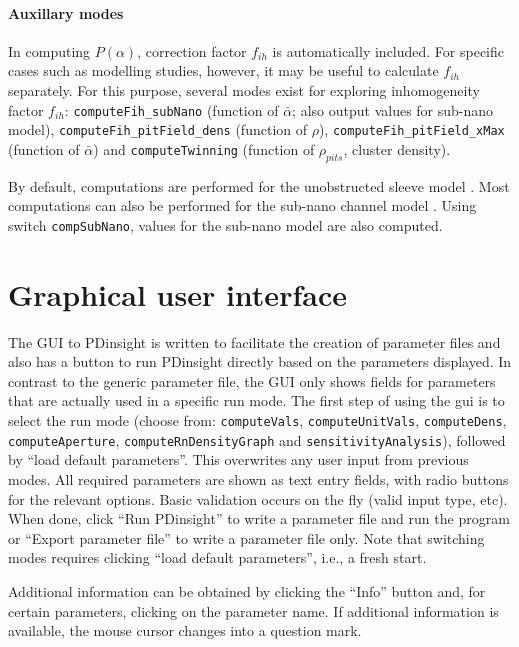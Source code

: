 \documentclass[a4paper,12pt]{article}
\newcommand{\SEL}{\bar{\alpha}}
\newcommand{\patchy}{f_{ih}}
\begin{document}
\paragraph{Auxillary modes} In computing $P(\alpha)$, correction factor $\patchy$ is automatically included. For specific cases such as modelling studies, however, it may be useful to calculate $\patchy$ separately. For this purpose, several modes exist for  exploring inhomogeneity factor $\patchy$: \texttt{computeFih\_subNano} (function of $\SEL$; also output values for sub-nano model), \texttt{computeFih\_pitField\_dens} (function of $\rho$), \texttt{computeFih\_pitField\_xMax} (function of $\SEL$) and \texttt{computeTwinning} (function of $\rho_{pits}$, cluster density). 


By default, computations are performed for the unobstructed sleeve model \citep{Deinum.e19}. Most computations can also be performed for the sub-nano channel model \cite{Liesche.fps13,Comtet.pp17}. Using switch \texttt{compSubNano}, values for the sub-nano model are also computed. 

\section{Graphical user interface}
The GUI to PDinsight is written to facilitate the creation of parameter files and also has a button to run PDinsight directly based on the parameters displayed. In contrast to the generic parameter file, the GUI only shows fields for parameters that are actually used in a specific run mode. The first step of using the gui is to select the run mode (choose from: \texttt{computeVals}, \texttt{computeUnitVals}, \texttt{computeDens}, \texttt{computeAperture},  \texttt{computeRnDensityGraph} and \texttt{sensitivityAnalysis}), followed by ``load default parameters''. This overwrites any user input from previous modes. All required parameters are shown as text entry fields, with radio buttons for the relevant options. Basic validation occurs on the fly (valid input type, etc). When done, click ``Run PDinsight'' to write a parameter file and run the program or ``Export parameter file'' to write a parameter file only. Note that switching modes requires clicking ``load default parameters'', i.e., a fresh start. 

Additional information can be obtained by clicking the ``Info'' button and, for certain parameters, clicking on the parameter name. If additional information is available, the mouse cursor changes into a question mark.
\end{document}

